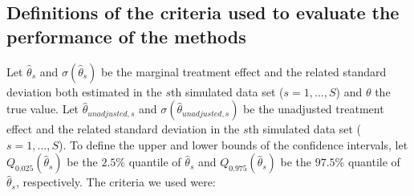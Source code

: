 \documentclass{article}
\begin{document}
\newpage
\subsection*{Definitions of the criteria used to evaluate the performance of the methods}\label{app2}


Let $\hat{\theta}_s$ and $\sigma(\hat{\theta}_s)$ be the marginal treatment effect and the related standard deviation both estimated in the $s$th simulated data set ($s=1, ..., S$) and $\theta$ the true value. Let $\hat{\theta}_{unadjusted,s}$ and $\sigma(\hat{\theta}_{unadjusted,s})$ be the unadjusted treatment effect and the related standard deviation in the $s$th simulated data set ($s=1, ..., S$). To define the upper and lower bounds of the confidence intervals, let \( Q_{0.025}(\hat{\theta}_s) \) be the \(2.5\%\) quantile of \( \hat{\theta}_s \) and \( Q_{0.975}(\hat{\theta}_s) \) be the \(97.5\%\) quantile of \( \hat{\theta}_s \), respectively. 
The criteria we used were:
\end{document}
